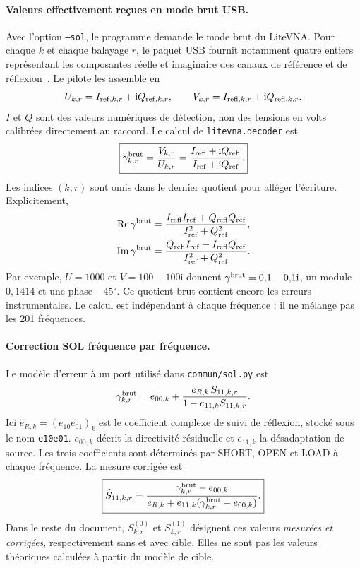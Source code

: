 \documentclass[11pt,a4paper]{article}
\newcommand{\ii}{\mathrm{i}}
\newcommand{\Reel}{\operatorname{Re}}
\begin{document}
\paragraph{Valeurs effectivement reçues en mode brut USB.}
Avec l'option \texttt{--sol}, le programme demande le mode brut du LiteVNA.
Pour chaque $k$ et chaque balayage $r$, le paquet USB fournit notamment quatre
entiers représentant les composantes réelle et imaginaire des canaux de
référence et de réflexion~\cite{litevnausb}. Le pilote les assemble en
\begin{equation}
 U_{k,r}=I_{{\rm ref},k,r}+\ii Q_{{\rm ref},k,r},\qquad
 V_{k,r}=I_{{\rm refl},k,r}+\ii Q_{{\rm refl},k,r}.
\end{equation}
$I$ et $Q$ sont des valeurs numériques de détection, non des tensions en volts
calibrées directement au raccord. Le calcul de \texttt{litevna.decoder} est
\begin{equation}\label{eq:s11-brut}
 \boxed{\gamma^{\rm brut}_{k,r}=\frac{V_{k,r}}{U_{k,r}}
 =\frac{I_{\rm refl}+\ii Q_{\rm refl}}{I_{\rm ref}+\ii Q_{\rm ref}}.}
\end{equation}
Les indices $(k,r)$ sont omis dans le dernier quotient pour alléger l'écriture.
Explicitement,
\begin{align}
 \Reel\gamma^{\rm brut}
 &=\frac{I_{\rm refl}I_{\rm ref}+Q_{\rm refl}Q_{\rm ref}}
 {I_{\rm ref}^2+Q_{\rm ref}^2},\\
 \operatorname{Im}\gamma^{\rm brut}
 &=\frac{Q_{\rm refl}I_{\rm ref}-I_{\rm refl}Q_{\rm ref}}
 {I_{\rm ref}^2+Q_{\rm ref}^2}.
\end{align}
Par exemple, $U=1000$ et $V=100-100\ii$ donnent
$\gamma^{\rm brut}=0{,}1-0{,}1\ii$, un module $0{,}1414$ et une phase
$-45^\circ$. Ce quotient brut contient encore les erreurs instrumentales.
Le calcul est indépendant à chaque fréquence : il ne mélange pas les
201 fréquences.

\paragraph{Correction SOL fréquence par fréquence.}
Le modèle d'erreur à un port utilisé dans \texttt{commun/sol.py} est
\begin{equation}
 \gamma^{\rm brut}_{k,r}=e_{00,k}+
 \frac{e_{R,k}\,S_{11,k,r}}
 {1-e_{11,k}S_{11,k,r}}.
\end{equation}
Ici $e_{R,k}=(e_{10}e_{01})_k$ est le coefficient complexe de suivi de
réflexion, stocké sous le nom \texttt{e10e01}. $e_{00,k}$ décrit la directivité
résiduelle et $e_{11,k}$ la désadaptation de source. Les trois coefficients sont déterminés par SHORT, OPEN
et LOAD à chaque fréquence. La mesure corrigée est
\begin{equation}\label{eq:s11-sol}
 \boxed{\widehat S_{11,k,r}=
 \frac{\gamma^{\rm brut}_{k,r}-e_{00,k}}
 {e_{R,k}+e_{11,k}(\gamma^{\rm brut}_{k,r}-e_{00,k})}.}
\end{equation}
Dans le reste du document, $S^{(0)}_{k,r}$ et $S^{(1)}_{k,r}$ désignent ces
valeurs \emph{mesurées et corrigées}, respectivement sans et avec cible.
Elles ne sont pas les valeurs théoriques calculées à partir du modèle de cible.
\end{document}

